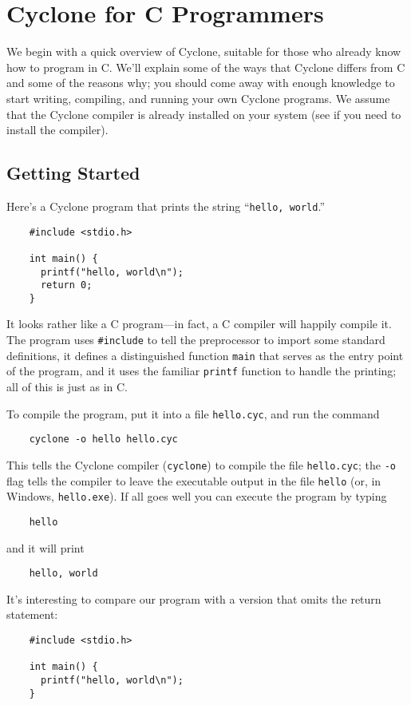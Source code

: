 \section{Cyclone for C Programmers}

We begin with a quick overview of Cyclone, suitable for those who
already know how to program in C\@.  We'll explain some of the ways
that Cyclone differs from C and some of the reasons why; you should
come away with enough knowledge to start writing, compiling, and
running your own Cyclone programs.  We assume that the Cyclone
compiler is already installed on your system (see
 if you need to install the compiler).

\subsection{Getting Started}

Here's a Cyclone program that prints the string ``\texttt{hello,
  world}.''
\begin{verbatim}
    #include <stdio.h>

    int main() {
      printf("hello, world\n");
      return 0;
    }
\end{verbatim}

It looks rather like a C program---in fact, a C compiler will happily
compile it.  The program uses \texttt{\#include} to tell the
preprocessor to import some standard definitions, it defines a
distinguished function \texttt{main} that serves as the entry point of
the program, and it uses the familiar \texttt{printf} function to
handle the printing; all of this is just as in C\@.

To compile the program, put it into a file \texttt{hello.cyc}, and run
the command
\begin{verbatim}
    cyclone -o hello hello.cyc 
\end{verbatim}
This tells the Cyclone compiler (\texttt{cyclone}) to compile the file
\texttt{hello.cyc}; the \texttt{-o} flag tells the compiler to leave
the executable output in the file \texttt{hello} (or, in Windows,
\texttt{hello.exe}).  If all goes well you can execute the program by
typing
\begin{verbatim}
    hello
\end{verbatim}
and it will print
\begin{verbatim}
    hello, world
\end{verbatim}

It's interesting to compare our program with a version that omits the
return statement:
\begin{verbatim}
    #include <stdio.h>

    int main() {
      printf("hello, world\n");
    }
\end{verbatim}

